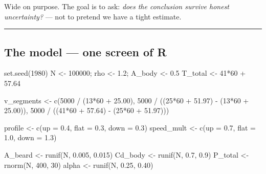 \documentclass[
  letterpaper,
  DIV=11,
  numbers=noendperiod]{scrartcl}
\newenvironment{Shaded}{\begin{snugshade}}{\end{snugshade}}
\newcommand{\AttributeTok}[1]{\textcolor[rgb]{0.40,0.45,0.13}{#1}}
\newcommand{\DecValTok}[1]{\textcolor[rgb]{0.68,0.00,0.00}{#1}}
\newcommand{\FloatTok}[1]{\textcolor[rgb]{0.68,0.00,0.00}{#1}}
\newcommand{\FunctionTok}[1]{\textcolor[rgb]{0.28,0.35,0.67}{#1}}
\newcommand{\NormalTok}[1]{\textcolor[rgb]{0.00,0.23,0.31}{#1}}
\newcommand{\OtherTok}[1]{\textcolor[rgb]{0.00,0.23,0.31}{#1}}
\newcommand{\SpecialCharTok}[1]{\textcolor[rgb]{0.37,0.37,0.37}{#1}}
\begin{document}
Wide on purpose. The goal is to ask: \emph{does the conclusion survive
honest uncertainty?} --- not to pretend we have a tight estimate.

\begin{center}\rule{0.5\linewidth}{0.5pt}\end{center}

\subsection{The model --- one screen of
R}\label{the-model-one-screen-of-r}

\begin{Shaded}
\begin{Highlighting}[]
\FunctionTok{set.seed}\NormalTok{(}\DecValTok{1980}\NormalTok{)}
\NormalTok{N }\OtherTok{\textless{}{-}} \DecValTok{100000}\NormalTok{;  rho }\OtherTok{\textless{}{-}} \FloatTok{1.2}\NormalTok{;  A\_body }\OtherTok{\textless{}{-}} \FloatTok{0.5}
\NormalTok{T\_total }\OtherTok{\textless{}{-}} \DecValTok{41}\SpecialCharTok{*}\DecValTok{60} \SpecialCharTok{+} \FloatTok{57.64}

\NormalTok{v\_segments }\OtherTok{\textless{}{-}} \FunctionTok{c}\NormalTok{(}\DecValTok{5000} \SpecialCharTok{/}\NormalTok{ (}\DecValTok{13}\SpecialCharTok{*}\DecValTok{60} \SpecialCharTok{+} \FloatTok{25.00}\NormalTok{),}
                \DecValTok{5000} \SpecialCharTok{/}\NormalTok{ ((}\DecValTok{25}\SpecialCharTok{*}\DecValTok{60} \SpecialCharTok{+} \FloatTok{51.97}\NormalTok{) }\SpecialCharTok{{-}}\NormalTok{ (}\DecValTok{13}\SpecialCharTok{*}\DecValTok{60} \SpecialCharTok{+} \FloatTok{25.00}\NormalTok{)),}
                \DecValTok{5000} \SpecialCharTok{/}\NormalTok{ ((}\DecValTok{41}\SpecialCharTok{*}\DecValTok{60} \SpecialCharTok{+} \FloatTok{57.64}\NormalTok{) }\SpecialCharTok{{-}}\NormalTok{ (}\DecValTok{25}\SpecialCharTok{*}\DecValTok{60} \SpecialCharTok{+} \FloatTok{51.97}\NormalTok{)))}

\NormalTok{profile    }\OtherTok{\textless{}{-}} \FunctionTok{c}\NormalTok{(}\AttributeTok{up =} \FloatTok{0.4}\NormalTok{, }\AttributeTok{flat =} \FloatTok{0.3}\NormalTok{, }\AttributeTok{down =} \FloatTok{0.3}\NormalTok{)}
\NormalTok{speed\_mult }\OtherTok{\textless{}{-}} \FunctionTok{c}\NormalTok{(}\AttributeTok{up =} \FloatTok{0.7}\NormalTok{, }\AttributeTok{flat =} \FloatTok{1.0}\NormalTok{, }\AttributeTok{down =} \FloatTok{1.3}\NormalTok{)}

\NormalTok{A\_beard }\OtherTok{\textless{}{-}} \FunctionTok{runif}\NormalTok{(N, }\FloatTok{0.005}\NormalTok{, }\FloatTok{0.015}\NormalTok{)}
\NormalTok{Cd\_body }\OtherTok{\textless{}{-}} \FunctionTok{runif}\NormalTok{(N, }\FloatTok{0.7}\NormalTok{, }\FloatTok{0.9}\NormalTok{)}
\NormalTok{P\_total }\OtherTok{\textless{}{-}} \FunctionTok{rnorm}\NormalTok{(N, }\DecValTok{400}\NormalTok{, }\DecValTok{30}\NormalTok{)}
\NormalTok{alpha   }\OtherTok{\textless{}{-}} \FunctionTok{runif}\NormalTok{(N, }\FloatTok{0.25}\NormalTok{, }\FloatTok{0.40}\NormalTok{)}


\end{Highlighting}
\end{Shaded}
\end{document}
